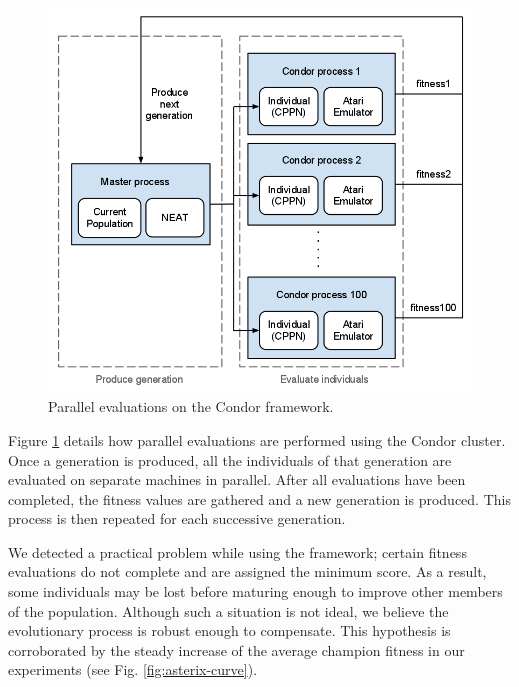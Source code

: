 \documentclass{acm_proc_article-sp}
\begin{document}
\begin{figure}[ht]
\begin{center}
\includegraphics[width=\columnwidth]{figures/condor-hyperneat-small.png}
\end{center}
\caption{Parallel evaluations on the Condor framework.}
\label{fig:condor}
\end{figure}

Figure \ref{fig:condor} details how parallel evaluations are performed using the Condor cluster. Once a generation is produced, all the individuals of that generation are evaluated on separate machines in parallel. After all evaluations have been completed, the fitness values are gathered and a new generation is produced. This process is then repeated for each successive generation. 

We detected a practical problem while using the framework; certain fitness evaluations do not complete and are assigned the minimum score. As a result, some individuals may be lost before maturing enough to improve other members of the population. Although such a situation is not ideal, we believe the evolutionary process is robust enough to compensate. This hypothesis is corroborated by the steady increase of the average champion fitness in our experiments (see Fig. \ref{fig:asterix-curve}). 
\end{document}
